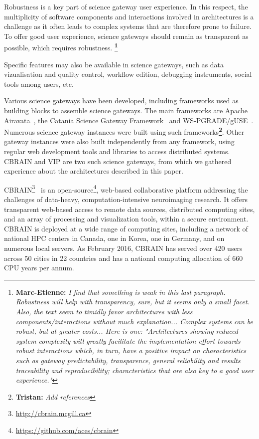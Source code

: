 \documentclass[preprint,3p,twocolumn]{elsarticle}
\newcommand{\note}[2]{\textbf{\Large{\color{blue}\footnote{{\color{blue}\textbf{#1:} \textit{#2}\color{black}}}}}}
\begin{document}
Robustness is a key part of science gateway user experience. In this
respect, the multiplicity of software components and interactions
involved in architectures is a challenge as it often leads to complex
systems that are therefore prone to failure. To offer good user
experience, science gateways should remain as transparent as possible,
which requires robustness.
\note{Marc-Etienne}{I find that something is weak in this last
paragraph. Robustness will help with transparency, sure, but it seems only a small facet.
Also, the text seem to timidly favor architectures with less components/interactions
without much explanation... Complex systems can be robust, but at greater costs...
Here is one:
"Architectures showing reduced system complexity will greatly facilitate the implementation
effort towards robust interactions which, in turn, have a positive impact on characteristics
such as gateway predictability, transparence, general reliability and results traceability and
reproducibility; characteristics that are also key to a good user experience."}

Specific features may also be available in science gateways, such as
data vizualisation and quality control, workflow edition, debugging
instruments, social tools among users, etc.

Various science gateways have been developed, including frameworks
used as building blocks to assemble science gateways. The main
frameworks are Apache Airavata~\cite{marru2011apache}, the Catania
Science Gateway Framework~\cite{Ardizzone2012} and
WS-PGRADE/gUSE~\cite{Kacsuk2012}. Numerous science gateway instances
were built using such frameworks\note{Tristan}{Add references}. Other
gateway instances were also built independently from any framework,
using regular web development tools and libraries to access
distributed systems. CBRAIN and VIP are two such science gateways,
from which we gathered experience about the architectures described in
this paper.

CBRAIN\footnote{\url{http://cbrain.mcgill.ca}}~\cite{SHER-14} is an
open-source\footnote{\url{https://github.com/aces/cbrain}}, web-based collaborative platform addressing the
challenges of data-heavy, computation-intensive neuroimaging
research. It offers transparent web-based access to remote data
sources, distributed computing sites, and an array of processing and
visualization tools, within a secure environment. CBRAIN is deployed
at a wide range of computing sites, including a network of national HPC
centers in Canada, one in Korea, one in Germany, and on numerous local
servers. As February 2016, CBRAIN has served over 420 users across 50
cities in 22 countries and has a national computing allocation of 660 CPU years
per annum.
\end{document}
